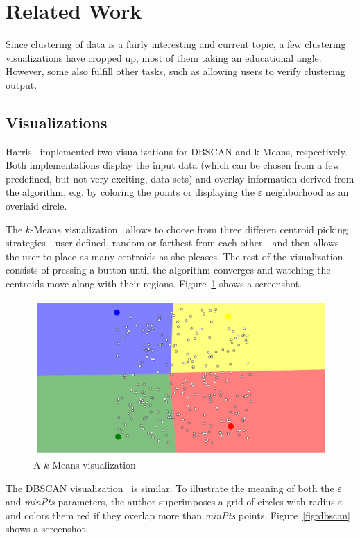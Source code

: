 \documentclass{vgtc} %
\begin{document}
\section{Related Work} %

Since clustering of data is a fairly interesting and current topic, a few clustering
visualizations have cropped up, most of them taking an educational angle. However,
some also fulfill other tasks, such as allowing users to verify clustering output.

\subsection{Visualizations}

Harris~\cite{dbscan,kmeans} implemented two visualizations for DBSCAN and
k-Means, respectively. Both implementations display the input data (which can
be chosen from a few predefined, but not very exciting, data sets) and overlay
information derived from the algorithm, e.g. by coloring the points or
displaying the $\varepsilon$ neighborhood as an overlaid circle.

The $k$-Means visualization~\cite{kmeans} allows to choose from three differen centroid picking
strategies---user defined, random or farthest from each other---and then allows the
user to place as many centroids as she pleases. The rest of the visualization consists
of pressing a button until the algorithm converges and watching the centroids move
along with their regions. Figure~\ref{fig:kmeans} shows a screenshot.

\begin{figure}[tb]
    \centering
    \includegraphics[width=\columnwidth]{kmeans}
    \caption{A $k$-Means visualization}
    \label{fig:kmeans}
\end{figure}

The DBSCAN visualization~\cite{dbscan} is similar. To illustrate the meaning of
both the $\varepsilon$ and \emph{minPts} parameters, the author superimposes a
grid of circles with radius $\varepsilon$ and colors them red if they overlap
more than \emph{minPts} points. Figure~\ref{fig:dbscan} shows a screenshot.
\end{document}
